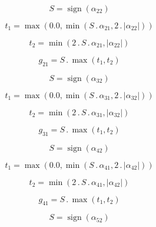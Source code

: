 \documentclass{article}
\begin{document}
\begin{dmath}S = \operatorname{sign}{\left (\alpha_{22} \right )}\end{dmath}

\begin{dmath}t_{1} = \max\left(0.0, \min\left(S \,.\, \alpha_{21}, 2 \,.\, \left|{\alpha_{22}}\right|\right)\right)\end{dmath}

\begin{dmath}t_{2} = \min\left(2 \,.\, S \,.\, \alpha_{21}, \left|{\alpha_{22}}\right|\right)\end{dmath}

\begin{dmath}g_{21} = S \,.\, \max\left(t_{1}, t_{2}\right)\end{dmath}

\begin{dmath}S = \operatorname{sign}{\left (\alpha_{32} \right )}\end{dmath}

\begin{dmath}t_{1} = \max\left(0.0, \min\left(S \,.\, \alpha_{31}, 2 \,.\, \left|{\alpha_{32}}\right|\right)\right)\end{dmath}

\begin{dmath}t_{2} = \min\left(2 \,.\, S \,.\, \alpha_{31}, \left|{\alpha_{32}}\right|\right)\end{dmath}

\begin{dmath}g_{31} = S \,.\, \max\left(t_{1}, t_{2}\right)\end{dmath}

\begin{dmath}S = \operatorname{sign}{\left (\alpha_{42} \right )}\end{dmath}

\begin{dmath}t_{1} = \max\left(0.0, \min\left(S \,.\, \alpha_{41}, 2 \,.\, \left|{\alpha_{42}}\right|\right)\right)\end{dmath}

\begin{dmath}t_{2} = \min\left(2 \,.\, S \,.\, \alpha_{41}, \left|{\alpha_{42}}\right|\right)\end{dmath}

\begin{dmath}g_{41} = S \,.\, \max\left(t_{1}, t_{2}\right)\end{dmath}

\begin{dmath}S = \operatorname{sign}{\left (\alpha_{52} \right )}\end{dmath}
\end{document}
